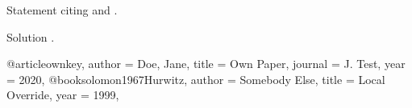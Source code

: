 \begin{problem}
\usetikzlibrary{arrows.meta}
Statement citing \cite{ownkey} and \cite{solomon1967Hurwitz}.
\end{problem}
\begin{solution}
Solution \cite[p.~3]{ownkey}.
\end{solution}
\begin{bibentries}
@article{ownkey,
  author = {Doe, Jane},
  title = {Own Paper},
  journal = {J. Test},
  year = {2020},
}
@book{solomon1967Hurwitz,
  author = {Somebody Else},
  title = {Local Override},
  year = {1999},
}
\end{bibentries}
